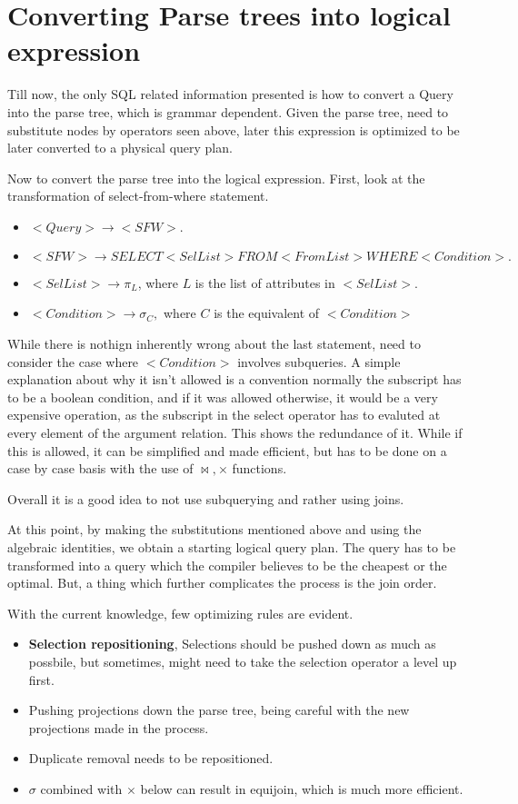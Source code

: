 \section{Converting Parse trees into logical expression}
Till now, the only SQL related information presented is how to convert a Query into the parse tree, which is grammar dependent. Given the parse tree, need to substitute nodes by operators seen above, later this expression is optimized to be later converted to a physical query plan.
\par Now to convert the parse tree into the logical expression. First, look at the transformation of select-from-where statement.
\begin{itemize}
\item $<Query> \rightarrow <SFW>.$
\item $<SFW> \rightarrow SELECT <SelList> FROM <FromList> WHERE <Condition>.$
\item $<SelList> \rightarrow \pi_{L}$, where $L$ is the list of attributes in $<SelList>.$
\item $<Condition> \rightarrow \sigma_{C},$ where $C$ is the equivalent of $<Condition>$ 
\end{itemize}
While there is nothign inherently wrong about the last statement, need to consider the case where $<Condition>$ involves subqueries. A simple explanation about why it isn't allowed is a convention normally the subscript has to be a boolean condition, and if it was allowed otherwise, it would be a very expensive operation, as the subscript in the select operator has to evaluted at every element of the argument relation. This shows the redundance of it. While if this is allowed, it can be simplified and made efficient, but has to be done on a case by case basis with the use of $\bowtie, \times$ functions.
\par Overall it is a good idea to not use subquerying and rather using joins.
\par At this point, by making the substitutions mentioned above and using the algebraic identities, we obtain a starting logical query plan. The query has to be transformed into a query which the compiler believes to be the cheapest or the optimal. But, a thing which further complicates the process is the join order.
\par With the current knowledge, few optimizing rules are evident.
\begin{itemize}
    \item \textbf{Selection repositioning}, Selections should be pushed down as much as possbile, but sometimes, might need to take the selection operator a level up first.
    \item Pushing projections down the parse tree, being careful with the new projections made in the process.
    \item Duplicate removal needs to be repositioned.
    \item $\sigma$ combined with $\times$ below can result in equijoin, which is much more efficient. 
\end{itemize}
